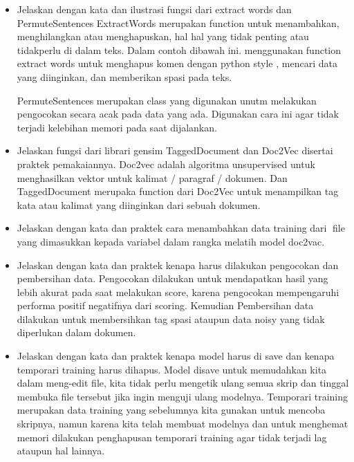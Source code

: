 \begin{enumerate}
\begin{enumerate}
\begin{itemize}
		
	\item Jelaskan dengan kata dan ilustrasi fungsi dari extract words dan PermuteSentences
	\hfill\break
	ExtractWords merupakan function untuk menambahkan, menghilangkan atau menghapuskan, hal hal yang tidak penting atau tidakperlu di dalam teks. Dalam contoh dibawah ini. menggunakan function extract words untuk menghapus komen dengan python style , mencari data yang diinginkan, dan memberikan spasi pada teks.
		
		\hfill\break
		PermuteSentences merupakan class yang digunakan unutm melakukan pengocokan secara acak pada data yang ada. Digunakan cara ini agar tidak terjadi kelebihan memori pada saat dijalankan. 
		

	\item Jelaskan fungsi dari librari gensim TaggedDocument dan Doc2Vec disertai praktek pemakaiannya.
	\hfill\break
	Doc2vec adalah algoritma unsupervised untuk menghasilkan vektor untuk kalimat / paragraf / dokumen. Dan TaggedDocument merupaka function dari Doc2Vec untuk menampilkan tag kata atau kalimat yang diinginkan dari sebuah dokumen.

		
	\item Jelaskan dengan kata dan praktek cara menambahkan data training dari file yang dimasukkan kepada variabel dalam rangka melatih model doc2vac.
	
	
		
		
	\item Jelaskan dengan kata dan praktek kenapa harus dilakukan pengocokan dan pembersihan data.
	\hfill\break
	Pengocokan dilakukan untuk mendapatkan hasil yang lebih akurat pada saat melakukan score, karena pengocokan mempengaruhi performa positif negatifnya dari scoring. Kemudian Pembersihan data dilakukan untuk membersihkan tag spasi ataupun data noisy yang tidak diperlukan dalam dokumen. 
	
	
	\item Jelaskan dengan kata dan praktek kenapa model harus di save dan kenapa temporari training harus dihapus.
	\hfill\break
	Model disave untuk memudahkan kita dalam meng-edit ﬁle, kita tidak perlu mengetik ulang semua skrip dan tinggal membuka ﬁle tersebut jika ingin menguji ulang modelnya. Temporari training merupakan data training yang sebelumnya kita gunakan untuk mencoba skripnya, namun karena kita telah membuat modelnya dan untuk menghemat memori dilakukan penghapusan temporari training agar tidak terjadi lag ataupun hal lainnya.
		
			

\end{itemize}
\end{enumerate}
\end{enumerate}

